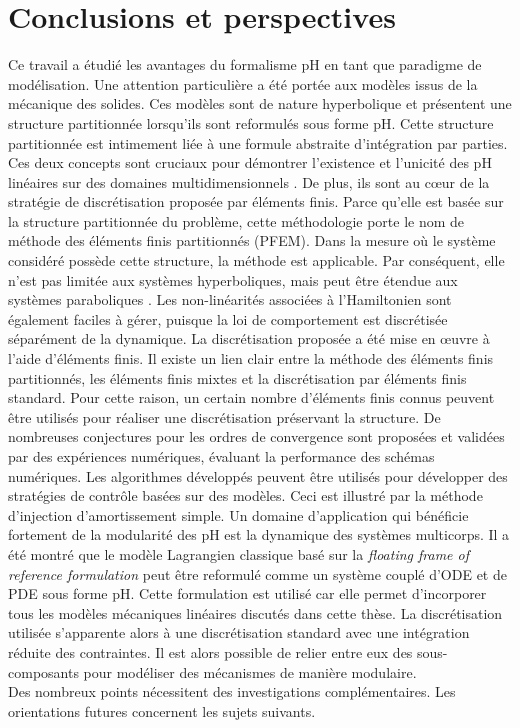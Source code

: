 \section{Conclusions et perspectives}

Ce travail a étudié les avantages du formalisme pH en tant que paradigme de modélisation. Une attention particulière a été portée aux modèles issus de la mécanique des solides. Ces modèles sont de nature hyperbolique et présentent une structure partitionnée lorsqu'ils sont reformulés sous forme pH. Cette structure partitionnée est intimement liée à une formule abstraite d'intégration par parties. Ces deux concepts sont cruciaux pour démontrer l'existence et l'unicité des pH linéaires sur des domaines multidimensionnels \cite{skrepek2019wellposedness}. De plus, ils sont au c\oe{}ur de la stratégie de discrétisation proposée par éléments finis. Parce qu'elle est basée sur la structure partitionnée du problème, cette méthodologie porte le nom de méthode des éléments finis partitionnés (PFEM). Dans la mesure où le système considéré possède cette structure, la méthode est applicable. Par conséquent, elle n’est pas limitée aux systèmes hyperboliques, mais peut être étendue aux systèmes paraboliques \cite{serhani2019discretization}. Les non-linéarités associées à l'Hamiltonien sont également faciles à gérer, puisque la loi de comportement est discrétisée séparément de la dynamique. La discrétisation proposée a été mise en \oe{}uvre à l'aide d'éléments finis. Il existe un lien clair entre la méthode des éléments finis partitionnés, les éléments finis mixtes et la discrétisation par éléments finis standard. Pour cette raison, un certain nombre d'éléments finis connus peuvent être utilisés pour réaliser une discrétisation préservant la structure. De nombreuses conjectures pour les ordres de convergence sont proposées et validées par des expériences numériques, évaluant la performance des schémas numériques. Les algorithmes développés peuvent être utilisés pour développer des stratégies de contrôle basées sur des modèles. Ceci est illustré par la méthode d'injection d'amortissement simple. Un domaine d'application qui bénéficie fortement de la modularité des pH est la dynamique des systèmes multicorps. Il a été montré que le modèle Lagrangien classique basé sur la \textit{floating frame of reference formulation} peut être reformulé comme un système couplé d'ODE et de PDE sous forme pH. Cette formulation est utilisé car elle permet d'incorporer tous les modèles mécaniques linéaires discutés dans cette thèse. La discrétisation utilisée s'apparente alors à une discrétisation standard avec une intégration réduite des contraintes. Il est alors possible de relier entre eux des sous-composants pour modéliser des mécanismes de manière modulaire. \\ Des nombreux points nécessitent des investigations complémentaires. Les orientations futures  concernent les sujets suivants.


